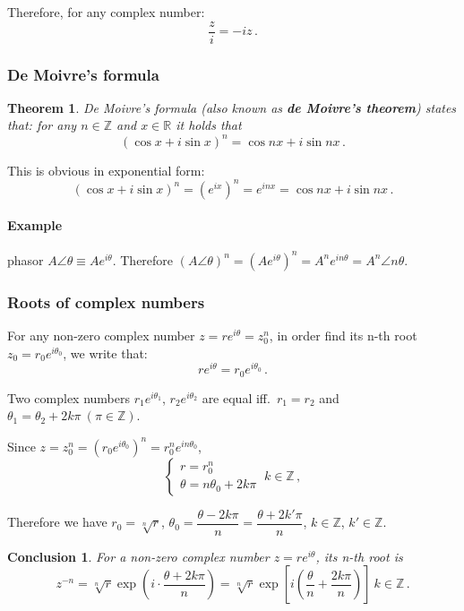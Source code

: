 \documentclass[UTF8]{ctexart}
\newtheorem{theorem}{Theorem}
\newtheorem{conclusion}{Conclusion}
\newcommand{\R}{\mathbb R}
\newcommand{\Z}{\mathbb Z}
\begin{document}
Therefore, for any complex number:
\[ \dfrac{z}{i} = - i z \,.\]

\subsubsection{De Moivre's formula}
\begin{thmbox}
    \begin{theorem}
        De Moivre's formula (also known as \textbf{de Moivre's theorem}) states that: for any $ n \in \Z $ and $ x \in \R $ it holds that \[ (\cos x + i \sin x)^n = \cos nx + i \sin nx \,.\] 
    \end{theorem}
\end{thmbox}

This is obvious in exponential form:
\[ (\cos x + i \sin x)^n = \left( e^{i x} \right)^n = e^{i nx} = \cos nx + i \sin nx \,.\]

\paragraph{Example} phasor $ A \angle \theta \equiv A e^{i \theta} $. Therefore $ (A \angle \theta)^n = \left( A e^{i \theta} \right)^n = A^n e^{i n \theta} = A^n \angle n\theta $.

\subsubsection{Roots of complex numbers}
For any non-zero complex number $ z = r e^{i \theta} = z_0^n $, in order find its n-th root $ z_0 = r_0 e^{i \theta_0} $, we write that: \[ r e^{i \theta} = r_0 e^{i \theta_0} \,.\]

Two complex numbers $ r_1 e^{i \theta_1} $, $ r_2 e^{i \theta_2} $ are equal iff.\ $ r_1 = r_2 $ and $ \theta_1 = \theta_2 + 2 k \pi\ (\pi \in \Z) $.

Since $ z = z_{0}^{n} = \left( r_0 e^{i \theta_0} \right)^n = r_0^n e^{i n \theta_0} $,
\[ \begin{cases}
    r = r_0^n \\
    \theta = n \theta_0 + 2 k \pi
\end{cases}\ k \in \Z \,,\]

Therefore we have $ r_0 = \sqrt[n]{r} $, $ \theta_0 = \dfrac{\theta - 2 k \pi}{n} = \dfrac{\theta + 2 k' \pi}{n} $, $ k \in \Z $, $ k' \in \Z $.

\begin{conclbox}
    \begin{conclusion}
        For a non-zero complex number $ z = r e^{i \theta} $, its n-th root is
        \[ z^{-n} = \sqrt[n]{r} \exp \left( i \cdot \dfrac{\theta + 2 k \pi}{n} \right) = \sqrt[n]{r} \exp \left[ i \left( \dfrac{\theta}{n} + \dfrac{2 k \pi}{n} \right) \right]\ k \in \Z \,.\]
    \end{conclusion}
\end{conclbox}
\end{document}
